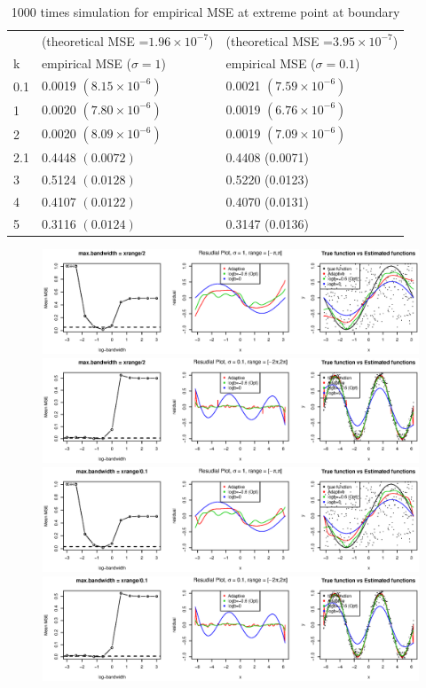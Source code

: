 \documentclass{article}
\begin{document}
\begin{itemize}
\begin{table}[H]
\centering
\begin{tabular}{l|l| l}
\hline\hline
& (theoretical MSE =$1.96\times 10^{-7}$) & (theoretical MSE =$3.95\times 10^{-7}$)\\
k & empirical MSE  ($\sigma=1$) &empirical MSE  ($\sigma=0.1$) \\\hline 
0.1&0.0019 $(8.15\times 10^{-6})$ & 0.0021 $(7.59\times 10^{-6})$\\
1 & 0.0020 $(7.80\times 10^{-6})$ &0.0019 $(6.76\times 10^{-6})$\\
2 & 0.0020 $(8.09\times 10^{-6})$ &0.0019 $(7.09\times 10^{-6})$\\
2.1 & 0.4448 $(0.0072)$ &0.4408 (0.0071)\\
3 & 0.5124 $(0.0128)$ & 0.5220 (0.0123)\\
4 & 0.4107 $(0.0122)$ & 0.4070 (0.0131)\\
5 & 0.3116 $(0.0124)$ & 0.3147 (0.0136)\\\hline
\end{tabular}
\caption{1000 times simulation for empirical MSE at extreme point at boundary}
\end{table}

\begin{figure}[H]
\includegraphics[width=\linewidth]{pic/sim.plot6.eps}
\includegraphics[width=\linewidth]{pic/sim.plot7.eps}
\includegraphics[width=\linewidth]{pic/sim.plot8.eps}
\includegraphics[width=\linewidth]{pic/sim.plot9.eps}
\end{figure}







\end{itemize}
\end{document}
